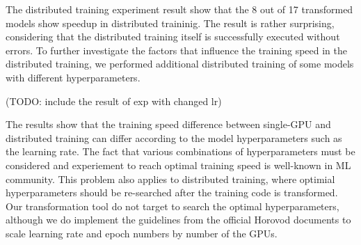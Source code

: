 The distributed training experiment result show that the 8 out of 17 transformed
models show speedup in distributed traininig. The result is rather surprising,
considering that the distributed training itself is successfully executed
without errors. To further investigate the factors that influence the
training speed in the distributed training, 
we performed additional distributed training of some models with
different hyperparameters.

(TODO: include the result of exp with changed lr)

The results show that the training speed difference between single-GPU and
distributed training can differ according to the model hyperparameters
such as the learning rate. The fact that various combinations of hyperparameters
must be considered and experiement to reach optimal training speed is 
well-known in ML community. This problem also applies to distributed training,
where optimial hyperparameters should be re-searched after the training
code is transformed. Our transformation tool do not target to search the 
optimal hyperparameters, although we do implement the guidelines from the
official Horovod documents to scale learning rate and epoch numbers
by number of the GPUs.  
